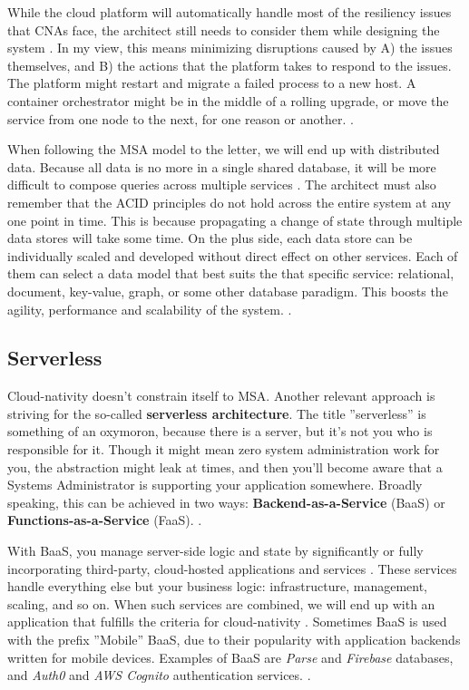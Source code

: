 \documentclass[utf8,english]{gradu3}
\begin{document}
While the cloud platform will automatically handle most of the resiliency issues
that CNAs face, the architect still needs to consider them while designing the
system \parencite{Microsoft2022-Resiliency}. In my view, this means minimizing
disruptions caused by A) the issues themselves, and B) the actions that the
platform takes to respond to the issues. The platform might restart and
migrate a failed process to a new host. A container orchestrator might
be in the middle of a rolling upgrade, or move the service from one node to
the next, for one reason or another. \parencite{Microsoft2022-Resiliency}.

When following the MSA model to the letter, we will end up with distributed
data. Because all data is no more in a single shared database, it will be more
difficult to compose queries across multiple services
\parencite{Microsoft2022-Data}. The architect must also remember that the ACID
principles do not hold across the entire system at any one point in time. This
is because propagating a change of state through multiple data stores will take
some time. On the plus side, each data store can be individually scaled and
developed without direct effect on other services. Each of them can select a
data model that best suits the that specific service: relational, document,
key-value, graph, or some other database paradigm. This boosts the agility,
performance and scalability of the system.  \parencite{Microsoft2022-Data}.


\subsection{Serverless}

Cloud-nativity doesn't constrain itself to MSA. Another relevant approach is
striving for the so-called \textbf{serverless architecture}. The title
''serverless'' is something of an oxymoron, because there is a server, but it's
not you who is responsible for it. Though it might mean zero system
administration work for you, the abstraction might leak at times, and then
you'll become aware that a Systems Administrator is supporting your application
somewhere. Broadly speaking, this can be achieved in two ways:
\textbf{Backend-as-a-Service} (BaaS) or \textbf{Functions-as-a-Service} (FaaS).
\parencite{Roberts2018}.

With BaaS, you manage server-side logic and state by significantly or fully
incorporating third-party, cloud-hosted applications and services
\parencite{Roberts2018}.  These services handle everything else but your
business logic: infrastructure, management, scaling, and so on. When such
services are combined, we will end up with an application that fulfills the
criteria for cloud-nativity \parencite[20]{Gannon2017}. Sometimes BaaS is used
with the prefix ''Mobile'' BaaS, due to their popularity with application
backends written for mobile devices. Examples of BaaS are \textit{Parse} and
\textit{Firebase} databases, and \textit{Auth0} and \textit{AWS Cognito}
authentication services.  \parencite{Roberts2018}.
\end{document}
